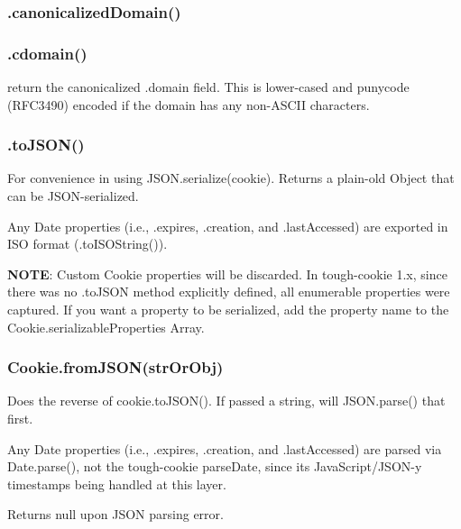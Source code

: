 \subsubsection*{{\ttfamily .canonicalized\+Domain()}}

\subsubsection*{{\ttfamily .cdomain()}}

return the canonicalized {\ttfamily .domain} field. This is lower-\/cased and punycode (R\+F\+C3490) encoded if the domain has any non-\/\+A\+S\+C\+II characters.

\subsubsection*{{\ttfamily .to\+J\+S\+O\+N()}}

For convenience in using {\ttfamily J\+S\+O\+N.\+serialize(cookie)}. Returns a plain-\/old {\ttfamily Object} that can be J\+S\+O\+N-\/serialized.

Any {\ttfamily Date} properties (i.\+e., {\ttfamily .expires}, {\ttfamily .creation}, and {\ttfamily .last\+Accessed}) are exported in I\+SO format ({\ttfamily .to\+I\+S\+O\+String()}).

{\bfseries N\+O\+TE}\+: Custom {\ttfamily Cookie} properties will be discarded. In tough-\/cookie 1.\+x, since there was no {\ttfamily .to\+J\+S\+ON} method explicitly defined, all enumerable properties were captured. If you want a property to be serialized, add the property name to the {\ttfamily Cookie.\+serializable\+Properties} Array.

\subsubsection*{{\ttfamily Cookie.\+from\+J\+S\+O\+N(str\+Or\+Obj)}}

Does the reverse of {\ttfamily cookie.\+to\+J\+S\+O\+N()}. If passed a string, will {\ttfamily J\+S\+O\+N.\+parse()} that first.

Any {\ttfamily Date} properties (i.\+e., {\ttfamily .expires}, {\ttfamily .creation}, and {\ttfamily .last\+Accessed}) are parsed via {\ttfamily Date.\+parse()}, not the tough-\/cookie {\ttfamily parse\+Date}, since it\textquotesingle{}s Java\+Script/\+J\+S\+O\+N-\/y timestamps being handled at this layer.

Returns {\ttfamily null} upon J\+S\+ON parsing error.


